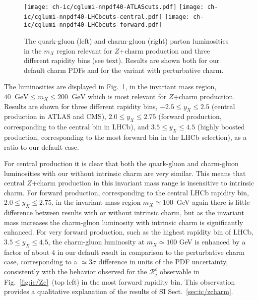 \begin{figure}[htbp]
  \begin{center}
    \texttt{[image: ch-ic/cglumi-nnpdf40-ATLAScuts.pdf]}
    \texttt{[image: ch-ic/cglumi-nnpdf40-LHCbcuts-central.pdf]}
    \texttt{[image: ch-ic/cglumi-nnpdf40-LHCbcuts-forward.pdf]}
    \caption{\small The quark-gluon (left) and charm-gluon (right)
      parton luminosities in the  $m_X$ region
      relevant for $Z$+charm production and  three different
      rapidity bins (see text). Results are shown both for our default charm
    PDFs and for the variant with perturbative charm. 
  \label{fig:ic/charm_luminosities} }
\end{center}
\end{figure}

The luminosities are displayed in Fig.~\ref{fig:ic/charm_luminosities},
in the  invariant mass region,
$40~\textrm{ GeV}\le m_X \le 200~\textrm{ GeV}$ which is most relevant for
$Z$+charm production.
%
Results are shown 
for three different
rapidity bins, $-2.5 \le y_X \le 2.5$ (central production in ATLAS and CMS),
$2.0 \le y_X \le 2.75$ (forward production, corresponding to the
central bin in LHCb),
and $3.5 \le y_X \le 4.5$ (highly boosted production, corresponding to
the most forward bin in the LHCb selection), as a ratio to our default case.

For central production it is clear that both the quark-gluon and
charm-gluon luminosities with our without intrinsic charm are very similar.
This means that central $Z$+charm production in this invariant mass
range is insensitive to intrinsic charm.
%
For forward production, corresponding to the  central LHCb rapidity
bin, $2.0 \le y_X \le 2.75$, in the invariant mass region  $m_X\simeq
100$~GeV again there is little difference between results with or
without intrinsic charm, but as the invariant mass increases the
charm-gluon luminosity with intrinsic charm is significantly enhanced.
%
For very forward production, such as the highest rapidity bin of LHCb,
$3.5 \le y_X \le 4.5$, the charm-gluon luminosity 
at $m_X \simeq 100$ GeV is enhanced  by a factor of about 4 in our
default result in comparison to the perturbative charm case, corresponding
to a $\simeq 3\sigma$ difference in units of the PDF uncertainty,
consistently with the behavior observed for the 
$\mathcal{R}_j^c$ observable in Fig.~\ref{fig:ic/Zc}~(top left) in the
most forward rapidity  bin.
%
This observation provides a qualitative explanation of
the results of SI Sect.~\ref{sec:ic/zcharm}.
